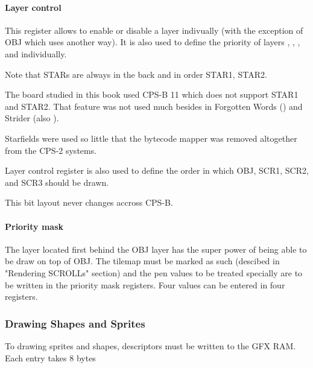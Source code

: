 \paragraph{Layer control} This register allows to enable or disable a layer indivually (with the exception of OBJ which uses another way). It is also used to define the priority of layers , , , and  individually.

Note that STARs are always in the back and in order STAR1, STAR2.
\pagebreak

 

The board studied in this book used CPS-B 11 which does not support STAR1 and STAR2. That feature was not used much besides in Forgotten Words () and Strider (also ).

\begin{trivia}
Starfields were used so little that the bytecode mapper was removed altogether from the CPS-2 systems.
\end{trivia}

Layer control register is also used to define the order in which OBJ, SCR1, SCR2, and SCR3 should be drawn.

 

This bit layout never changes accross CPS-B.

\paragraph{Priority mask}
The layer located first behind the OBJ layer has the super power of being able to be draw on top of OBJ. The tilemap must be marked as such (descibed in "Rendering SCROLLs" section) and the pen values to be treated specially are to be written in the priority mask registers. Four values can be entered in four registers.



 






\subsubsection{Drawing Shapes and Sprites}
To drawing sprites and shapes, descriptors must be written to the GFX RAM. Each entry takes 8 bytes

